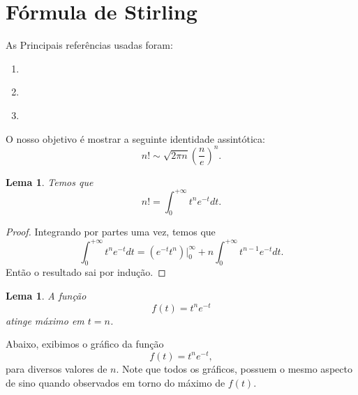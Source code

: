 \documentclass[12pt,a4paper,oneside]{book}
\newtheorem{lemma}[theorem]{Lema}
\theoremstyle{definition}
\theoremstyle{remark}
\numberwithin{equation}{section}
\begin{document}
\section{Fórmula de Stirling}\label{sec-stirling} 
\begin{tcolorbox}[colback = white]
As Principais referências usadas foram:
\begin{enumerate}
\item \cite{taomatrix}
\item \cite{spencer-asymtopia}
\item \cite{keith-stirling}
\end{enumerate}
\end{tcolorbox}

\begin{tcolorbox}[colback = yellow!60]

O nosso objetivo é mostrar a seguinte identidade assintótica:
\begin{equation}
n!\sim \sqrt{2\pi n}\left( \dfrac{n}{e}\right)^n.
\end{equation}\label{stirling-formula}

\end{tcolorbox}

\begin{lemma}
Temos que
$$n! = \int_0^{+\infty} t^n e^{-t}dt . $$
\end{lemma}

\begin{proof}
Integrando por partes uma vez, temos que
$$\int_0^{+\infty} t^n e^{-t}dt = \left( e^{-t}t^n\right)\Big|^{\infty}_0 +n\int_0^{+\infty} t^{n-1} e^{-t}dt.$$
Então o resultado sai por indução.
\end{proof}

\begin{lemma}
A função $$f(t) = t^ne^{-t}$$
atinge máximo em $t=n$.
\end{lemma}

Abaixo, exibimos o gráfico da função $$ f(t) = t^ne^{-t},$$
para diversos valores de $n.$ Note que todos os gráficos, possuem o mesmo aspecto de sino quando observados em torno do máximo de $f(t)$. 
\end{document}
